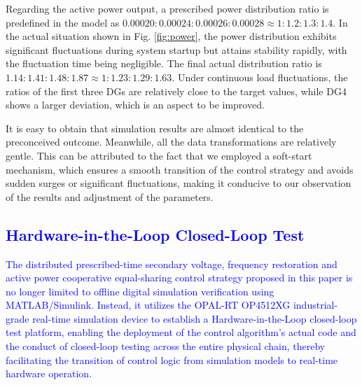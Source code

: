 \documentclass[]{interact}
\theoremstyle{plain}%
\theoremstyle{definition}
\theoremstyle{remark}
\begin{document}
Regarding the active power output, a prescribed power distribution ratio is predefined in the model as \( 0.00020: 0.00024: 0.00026: 0.00028 \approx 1: 1.2: 1.3: 1.4 \). In the actual situation shown in Fig. \ref{fig:power}, the power distribution exhibits significant fluctuations during system startup but attains stability rapidly, with the fluctuation time being negligible. The final actual distribution ratio is \( 1.14: 1.41: 1.48: 1.87\approx 1: 1.23: 1.29: 1.63  \). Under continuous load fluctuations, the ratios of the first three DGs are relatively close to the target values, while DG4 shows a larger deviation, which is an aspect to be improved.

It is easy to obtain that simulation results are almost identical to the preconceived outcome. Meanwhile, all the data transformations are relatively gentle. This can be attributed to the fact that we employed a soft-start mechanism, which ensures a smooth transition of the control strategy and avoids sudden surges or significant fluctuations, making it conducive to our observation of the results and adjustment of the parameters.


\textcolor{blue}{\section{Hardware-in-the-Loop Closed-Loop Test}}

\textcolor{blue}{
The distributed prescribed-time secondary voltage, frequency restoration and active power cooperative equal-sharing control strategy proposed in this paper is no longer limited to offline digital simulation verification using MATLAB/Simulink. 
Instead, it utilizes the OPAL-RT OP4512XG industrial-grade real-time simulation device to establish a Hardware-in-the-Loop closed-loop test platform, enabling the deployment of the control algorithm's actual code and the conduct of closed-loop testing across the entire physical chain, thereby facilitating the transition of control logic from simulation models to real-time hardware operation.
}
\end{document}
